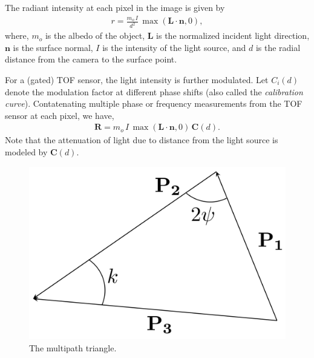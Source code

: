 The radiant intensity at each pixel in the image is given by
%
\begin{align}
r = \frac{m_o \, I}{d^2} \, \max{(\mathbf{L} \cdot \mathbf{n}, 0)},
\end{align}
%
where, $m_o$ is the albedo of the object,
$\mathbf{L}$ is the normalized incident light direction,
$\mathbf{n}$ is the surface normal,
$I$ is the intensity of the light source, and
$d$ is the radial distance from the camera to the surface point.

For a (gated) TOF sensor, the light intensity is further modulated.
Let $C_i(d)$ denote the modulation factor at different phase shifts (also called the \emph{calibration curve}).
Contatenating multiple phase or frequency measurements from the TOF sensor at each pixel, we have,
%
\begin{align}
\mathbf{R} = m_o \, I \, \max{(\mathbf{L} \cdot \mathbf{n}, 0)} \, \mathbf{C}(d).
\end{align}
%
Note that the attenuation of light due to distance from the light source is modeled by $\mathbf{C}(d)$.

\begin{figure}
\centering
		\includegraphics[width=0.8\columnwidth]{content/images/MultipathTriangle/MultipathTriangle.png}
		\caption{The multipath triangle.}
		\label{fig:multipath_triangle}
\end{figure}


